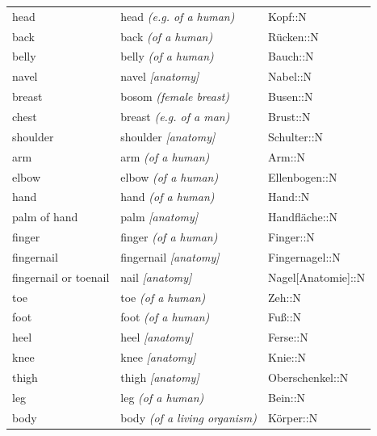 \begin{center}
\begin{longtable}{lll}
{\sc \lowercase{	HEAD	}}	&	head	\textit{\footnotesize (e.g. of a human)}	&	Kopf::N	\\
{\sc \lowercase{	BACK	}}	&	back	\textit{\footnotesize (of a human)}	&	Rücken::N	\\
{\sc \lowercase{	BELLY	}}	&	belly	\textit{\footnotesize (of a human)}	&	Bauch::N	\\
{\sc \lowercase{	NAVEL	}}	&	navel	\textit{\footnotesize [anatomy]}	&	Nabel::N	\\
{\sc \lowercase{	BREAST	}}	&	bosom	\textit{\footnotesize (female breast)}	&	Busen::N	\\
{\sc \lowercase{	CHEST	}}	&	breast	\textit{\footnotesize (e.g. of a man)}	&	Brust::N	\\
{\sc \lowercase{	SHOULDER	}}	&	shoulder	\textit{\footnotesize [anatomy]}	&	Schulter::N	\\
{\sc \lowercase{	ARM	}}	&	arm	\textit{\footnotesize (of a human)}	&	Arm::N	\\
{\sc \lowercase{	ELBOW	}}	&	elbow	\textit{\footnotesize (of a human)}	&	Ellenbogen::N	\\
{\sc \lowercase{	HAND	}}	&	hand	\textit{\footnotesize (of a human)}	&	Hand::N	\\
{\sc \lowercase{	PALM OF HAND	}}	&	palm	\textit{\footnotesize [anatomy]}	&	Handfläche::N	\\
{\sc \lowercase{	FINGER	}}	&	finger	\textit{\footnotesize (of a human)}	&	Finger::N	\\
{\sc \lowercase{	FINGERNAIL	}}	&	fingernail	\textit{\footnotesize [anatomy]}	&	Fingernagel::N	\\
{\sc \lowercase{	\footnotesize FINGERNAIL OR TOENAIL	}}	&	nail	\textit{\footnotesize [anatomy]}	&	Nagel[Anatomie]::N	\\
{\sc \lowercase{	TOE	}}	&	toe	\textit{\footnotesize (of a human)}	&	Zeh::N	\\
{\sc \lowercase{	FOOT	}}	&	foot	\textit{\footnotesize (of a human)}	&	Fuß::N	\\
{\sc \lowercase{	HEEL	}}	&	heel	\textit{\footnotesize [anatomy]}	&	Ferse::N	\\
{\sc \lowercase{	KNEE	}}	&	knee	\textit{\footnotesize [anatomy]}	&	Knie::N	\\
{\sc \lowercase{	THIGH	}}	&	thigh	\textit{\footnotesize [anatomy]}	&	Oberschenkel::N	\\
{\sc \lowercase{	LEG	}}	&	leg	\textit{\footnotesize (of a human)}	&	Bein::N	\\
{\sc \lowercase{	BODY	}}	&	body	\textit{\footnotesize (of a living organism)}	&	Körper::N	\\

\end{longtable}
\end{center}
